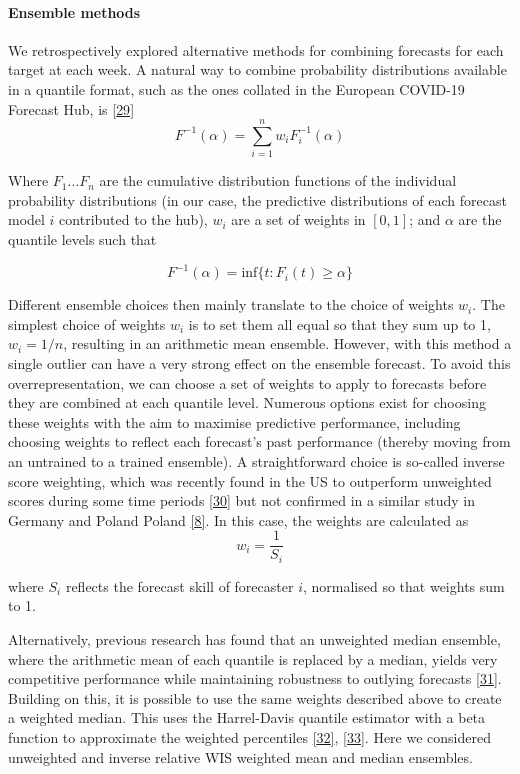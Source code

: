\documentclass[
]{article}
\begin{document}
\hypertarget{ensemble-methods}{%
\paragraph{Ensemble methods}\label{ensemble-methods}}

We retrospectively explored alternative methods for combining forecasts
for each target at each week. A natural way to combine probability
distributions available in a quantile format, such as the ones collated
in the European COVID-19 Forecast Hub, is
\protect\hyperlink{ref-genestVincentizationRevisited1992}{{[}29{]}}
\[F^{-1}(\alpha) = \sum_{i=1}^{n}w_i F_i^{-1}(\alpha)\]

Where \(F_{1} \ldots F_{n}\) are the cumulative distribution functions
of the individual probability distributions (in our case, the predictive
distributions of each forecast model \(i\) contributed to the hub),
\(w_i\) are a set of weights in \([0,1]\); and \(\alpha\) are the
quantile levels such that

\[F^{-1}(\alpha) = \mathrm{inf} \{t : F_i(t) \geq \alpha \}\]

Different ensemble choices then mainly translate to the choice of
weights \(w_i\). The simplest choice of weights \(w_i\) is to set them
all equal so that they sum up to 1, \(w_i=1/n\), resulting in an
arithmetic mean ensemble. However, with this method a single outlier can
have a very strong effect on the ensemble forecast. To avoid this
overrepresentation, we can choose a set of weights to apply to forecasts
before they are combined at each quantile level. Numerous options exist
for choosing these weights with the aim to maximise predictive
performance, including choosing weights to reflect each forecast's past
performance (thereby moving from an untrained to a trained ensemble). A
straightforward choice is so-called inverse score weighting, which was
recently found in the US to outperform unweighted scores during some
time periods
\protect\hyperlink{ref-taylorCombiningProbabilisticForecasts2021}{{[}30{]}}
but not confirmed in a similar study in Germany and Poland Poland
\protect\hyperlink{ref-bracherPreregisteredShorttermForecasting2021}{{[}8{]}}.
In this case, the weights are calculated as \[w_i = \frac{1}{S_i}\]

where \(S_i\) reflects the forecast skill of forecaster \(i\),
normalised so that weights sum to 1.

Alternatively, previous research has found that an unweighted median
ensemble, where the arithmetic mean of each quantile is replaced by a
median, yields very competitive performance while maintaining robustness
to outlying forecasts
\protect\hyperlink{ref-rayComparingTrainedUntrained2022}{{[}31{]}}.
Building on this, it is possible to use the same weights described above
to create a weighted median. This uses the Harrel-Davis quantile
estimator with a beta function to approximate the weighted percentiles
\protect\hyperlink{ref-harrellNewDistributionfreeQuantile1982}{{[}32{]}},
\protect\hyperlink{ref-rdocumentationCNORMVersionWeighted}{{[}33{]}}.
Here we considered unweighted and inverse relative WIS weighted mean and
median ensembles.
\end{document}
